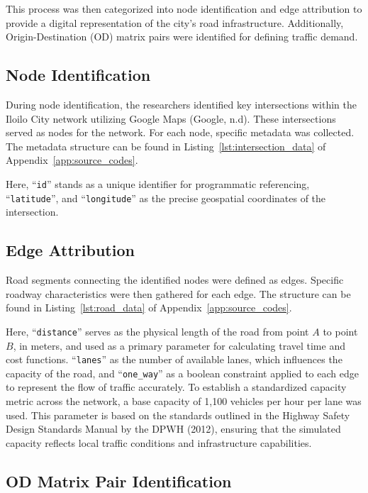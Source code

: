 This process was then categorized into node identification and edge attribution to provide a digital representation of the city's road infrastructure.  Additionally, Origin-Destination (OD) matrix pairs were identified for defining traffic demand. 

\subsection{Node Identification}
\label{sec:node_identification}

During node identification,  the researchers identified key intersections within the Iloilo City network utilizing Google Maps (Google, n.d). These intersections served as nodes for the network. For each node, specific metadata was collected. The metadata structure can be found in Listing~\ref{lst:intersection_data} of Appendix~\ref{app:source_codes}.

Here, ``\texttt{id}'' stands as a unique identifier for programmatic referencing, ``\texttt{latitude}'', and ``\texttt{longitude}'' as the precise geospatial coordinates of the intersection.


\subsection{Edge Attribution}
\label{sec:edge_attribution}

Road segments connecting the identified nodes were defined as edges. Specific roadway characteristics were then gathered for each edge. The structure can be found in Listing~\ref{lst:road_data} of Appendix~\ref{app:source_codes}.

Here, ``\texttt{distance}'' serves as the physical length of the road from point $A$ to point $B$, in meters, and used as a primary parameter for calculating travel time and cost functions. ``\texttt{lanes}'' as the number of available lanes, which influences the capacity of the road, and ``\texttt{one\_way}'' as a boolean constraint applied to each edge to represent the flow of traffic accurately. To establish a standardized capacity metric across the network, a base capacity of 1,100 vehicles per hour per lane was used. This parameter is based on the standards outlined in the Highway Safety Design Standards Manual by the DPWH (2012), ensuring that the simulated capacity reflects local traffic conditions and infrastructure capabilities.

\subsection{OD Matrix Pair Identification}
\label{sec:pair_identification}

